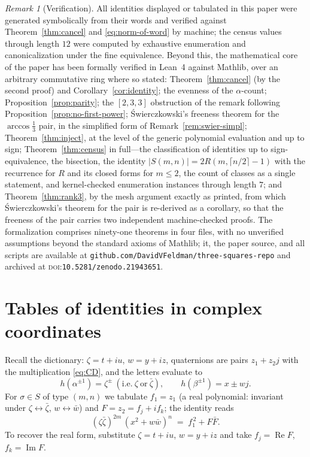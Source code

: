 \documentclass[11pt]{article}
\theoremstyle{definition}
\theoremstyle{remark}
\newtheorem{remark}[theorem]{Remark}
\newcommand{\bz}{\bar{\zeta}}
\newcommand{\bw}{\bar{w}}
\begin{document}
\begin{remark}[Verification]\label{rem:verify}
All identities displayed or tabulated in this paper were generated symbolically from their words and verified against Theorem~\ref{thm:cancel} and \eqref{eq:norm-of-word} by machine; the census values through length $12$ were computed by exhaustive enumeration and canonicalization under the fine equivalence. Beyond this, the mathematical core of the paper has been formally verified in Lean~4 against Mathlib, over an arbitrary commutative ring where so stated: Theorem~\ref{thm:cancel} (by the second proof) and Corollary~\ref{cor:identity}; the evenness of the $\alpha$-count; Proposition~\ref{prop:parity}; the $[2,3,3]$ obstruction of the remark following Proposition~\ref{prop:no-first-power}; Świerczkowski's freeness theorem for the $\arccos\frac13$ pair, in the simplified form of Remark~\ref{rem:swier-simpl}; Theorem~\ref{thm:inject}, at the level of the generic polynomial evaluation and up to sign; Theorem~\ref{thm:census} in full---the classification of identities up to sign-equivalence, the bisection, the identity $|S(m,n)|=2R(m,\lceil n/2\rceil-1)$ with the recurrence for $R$ and its closed forms for $m\le2$, the count of classes as a single statement, and kernel-checked enumeration instances through length $7$; and Theorem~\ref{thm:rank3}, by the mesh argument exactly as printed, from which Świerczkowski's theorem for the pair is re-derived as a corollary, so that the freeness of the pair carries two independent machine-checked proofs. The formalization comprises ninety-one theorems in four files, with no unverified assumptions beyond the standard axioms of Mathlib; it, the paper source, and all scripts are available at \texttt{github.com/\allowbreak DavidVFeldman/\allowbreak three-squares-repo} and archived at \textsc{doi}:\texttt{10.5281/zenodo.21943651}.
\end{remark}

\appendix

\section{Tables of identities in complex coordinates}\label{app:tables}

Recall the dictionary: $\zeta=t+iu$, $w=y+iz$, quaternions are pairs $z_1+z_2j$ with the multiplication \eqref{eq:CD}, and the letters evaluate to
\[
h(\alpha^{\pm1})=\zeta^{\pm}\ (\text{i.e.}\ \zeta\ \text{or}\ \bz),\qquad h(\beta^{\pm1})=x\pm wj .
\]
For $\sigma\in S$ of type $(m,n)$ we tabulate $f_1=z_1$ (a real polynomial: invariant under $\zeta\leftrightarrow\bz$, $w\leftrightarrow\bw$) and $F=z_2=f_j+if_k$; the identity reads
\[
(\zeta\bz)^{2m}\,(x^2+w\bw)^{n}\;=\;f_1^{\,2}+F\bar F .
\]
To recover the real form, substitute $\zeta=t+iu$, $w=y+iz$ and take $f_j=\operatorname{Re}F$, $f_k=\operatorname{Im}F$.
\end{document}
